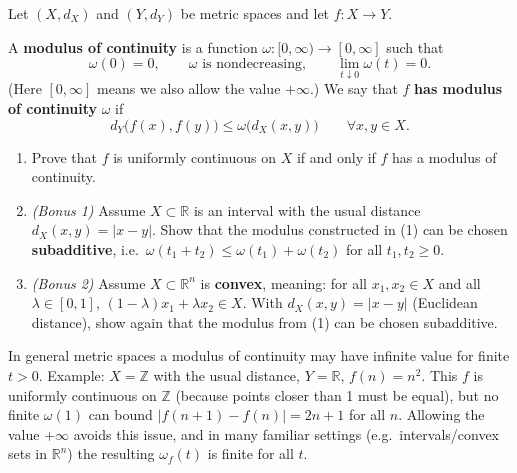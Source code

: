 
\begin{exercise}
\label{ex:moduli_of_continuity}
Let $(X,d_X)$ and $(Y,d_Y)$ be metric spaces and let $f : X \to Y$.

A \textbf{modulus of continuity} is a function $\omega : [0,\infty) \to [0,\infty]$ such that
$$\omega(0) = 0, \qquad \omega \text{ is nondecreasing}, \qquad \lim_{t \downarrow 0}\omega(t) = 0.$$
(Here $[0,\infty]$ means we also allow the value $+\infty$.) We say that $f$ \textbf{has modulus
of continuity} $\omega$ if
$$d_Y\big(f(x), f(y)\big) \leq \omega\big(d_X(x,y)\big) \qquad \forall x,y \in X.$$
\begin{enumerate}[label=\textbf{(\alph*)}]
  \item Prove that $f$ is uniformly continuous on $X$ if and only if $f$ has a modulus of
    continuity.
  \item \textit{(Bonus 1)} Assume $X \subset \mathbb{R}$ is an interval with the usual distance
    $d_X(x,y) = |x-y|$. Show that the modulus constructed in (1) can be chosen
    \textbf{subadditive}, i.e.\ $\omega(t_1+t_2) \leq \omega(t_1) + \omega(t_2)$ for all
    $t_1, t_2 \geq 0$.
  \item \textit{(Bonus 2)} Assume $X \subset \mathbb{R}^n$ is \textbf{convex}, meaning: for all
    $x_1, x_2 \in X$ and all $\lambda \in [0,1]$, $(1-\lambda)x_1 + \lambda x_2 \in X$. With
    $d_X(x,y) = |x-y|$ (Euclidean distance), show again that the modulus from (1) can be chosen
    subadditive.
\end{enumerate}

\begin{remark}[official]
In general metric spaces a modulus of continuity may have infinite value for finite $t > 0$.
Example: $X = \mathbb{Z}$ with the usual distance, $Y = \mathbb{R}$, $f(n) = n^2$. This $f$ is
uniformly continuous on $\mathbb{Z}$ (because points closer than 1 must be equal), but no finite
$\omega(1)$ can bound $|f(n+1) - f(n)| = 2n+1$ for all $n$. Allowing the value $+\infty$ avoids
this issue, and in many familiar settings (e.g.\ intervals/convex sets in $\mathbb{R}^n$) the
resulting $\omega_f(t)$ is finite for all $t$.
\end{remark}

\end{exercise}
